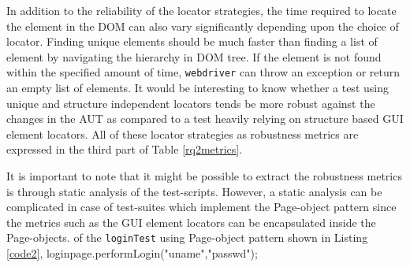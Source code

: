 In addition to the reliability of the locator strategies, the time required to locate the element in the DOM can also vary significantly depending upon the choice of locator. Finding unique elements should be much faster than finding a list of element by navigating the hierarchy in DOM tree. If the element is not found within the specified amount of time, \texttt{webdriver} can throw an exception or return an empty list of elements. It would be interesting to know whether a test using unique and structure independent locators tends be more robust against the changes in the AUT as compared to a test heavily relying on structure based GUI element locators. All of these locator strategies as robustness metrics are expressed in the third part of Table \ref{rq2metrics}.  

\begin{Large}
It is important to note that it might be possible to extract the robustness metrics is through static analysis of the test-scripts. However, a static analysis can be complicated in case of test-suites which implement the Page-object pattern since the metrics such as the GUI element locators can be encapsulated inside the Page-objects.  of the \texttt{loginTest} using Page-object pattern shown in Listing \ref{code2}, loginpage.performLogin("uname","passwd"); 
\end{Large}








